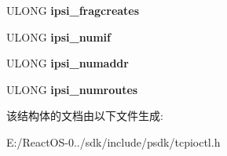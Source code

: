 \begin{DoxyCompactItemize}
U\+L\+O\+NG {\bfseries ipsi\+\_\+fragcreates}
\item 
\mbox{\label{struct_i_p_s_n_m_p_info_a36ce3d2e39ccddd584963a2d28707bbd}} 
U\+L\+O\+NG {\bfseries ipsi\+\_\+numif}
\item 
\mbox{\label{struct_i_p_s_n_m_p_info_a84dcecc0f104199d7acd3c7fe6b5b17b}} 
U\+L\+O\+NG {\bfseries ipsi\+\_\+numaddr}
\item 
\mbox{\label{struct_i_p_s_n_m_p_info_a60f2ecb33f9cee37ee05ff626befae02}} 
U\+L\+O\+NG {\bfseries ipsi\+\_\+numroutes}
\end{DoxyCompactItemize}


该结构体的文档由以下文件生成\+:\begin{DoxyCompactItemize}
\item 
E\+:/\+React\+O\+S-\/0../sdk/include/psdk/tcpioctl.\+h\end{DoxyCompactItemize}
